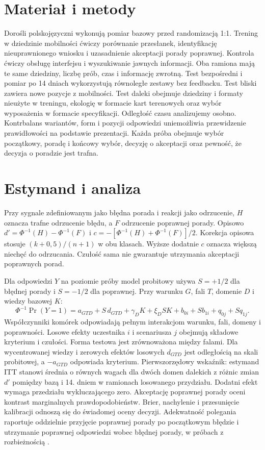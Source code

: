 \documentclass[11pt,a4paper]{article}
\begin{document}
\section{Materiał i metody}
Dorośli polskojęzyczni wykonują pomiar bazowy przed randomizacją 1:1. Trening w dziedzinie mobilności ćwiczy porównanie przesłanek, identyfikację nieuprawnionego wniosku i uzasadnienie akceptacji porady poprawnej. Kontrola ćwiczy obsługę interfejsu i wyszukiwanie jawnych informacji. Oba ramiona mają te same dziedziny, liczbę prób, czas i informację zwrotną. Test bezpośredni i pomiar po 14 dniach wykorzystują równoległe zestawy bez feedbacku. Test bliski zawiera nowe pozycje z mobilności. Test daleki obejmuje dziedziny i formaty nieużyte w treningu, ekologię w formacie kart terenowych oraz wybór wyposażenia w formacie specyfikacji. Odległość czasu analizujemy osobno. Kontrbalans wariantów, form i pozycji odpowiedzi uniemożliwia przewidzenie prawidłowości na podstawie prezentacji. Każda próba obejmuje wybór początkowy, poradę i końcowy wybór, decyzję o akceptacji oraz pewność, że decyzja o poradzie jest trafna.

\section{Estymand i analiza}
Przy sygnale zdefiniowanym jako błędna porada i reakcji jako odrzucenie, $H$ oznacza trafne odrzucenie błędu, a $F$ odrzucenie poprawnej porady. Opisowo $d'=\Phi^{-1}(H)-\Phi^{-1}(F)$ i $c=-[\Phi^{-1}(H)+\Phi^{-1}(F)]/2$. Korekcja opisowa stosuje $(k+0{,}5)/(n+1)$ w obu klasach. Wyższe dodatnie $c$ oznacza większą niechęć do odrzucania. Czułość sama nie gwarantuje utrzymania akceptacji poprawnych porad.

Dla odpowiedzi $Y$ na poziomie próby model probitowy używa $S=+1/2$ dla błędnej porady i $S=-1/2$ dla poprawnej. Przy warunku $G$, fali $T$, domenie $D$ i wiedzy bazowej $K$:
\[
\Phi^{-1}\Pr(Y=1)=a_{GTD}+S\,d_{GTD}+
\gamma_D K+\xi_D SK+b_{0i}+S b_{1i}+q_{0j}+S q_{1j}.
\]
Współczynniki komórek odpowiadają pełnym interakcjom warunku, fali, domeny i poprawności. Losowe efekty uczestnika $i$ i scenariusza $j$ obejmują składowe kryterium i czułości. Forma testowa jest zrównoważona między falami. Dla wycentrowanej wiedzy i zerowych efektów losowych $d_{GTD}$ jest odległością na skali probitowej, a $-a_{GTD}$ odpowiada kryterium. Pierwszorzędowy wskaźnik: estymand ITT stanowi średnia o równych wagach dla dwóch domen dalekich z różnic zmian $d'$ pomiędzy bazą i 14. dniem w ramionach losowanego przydziału. Dodatni efekt wymaga przedziału wykluczającego zero. Akceptację poprawnej porady oceni kontrast marginalnych prawdopodobieństw. Brier, nachylenie i przesunięcie kalibracji odnoszą się do świadomej oceny decyzji. Adekwatność polegania raportuje oddzielnie przyjęcie poprawnej porady po początkowym błędzie i utrzymanie poprawnej odpowiedzi wobec błędnej porady, w próbach z rozbieżnością \citep{schemmer2023}.
\end{document}
